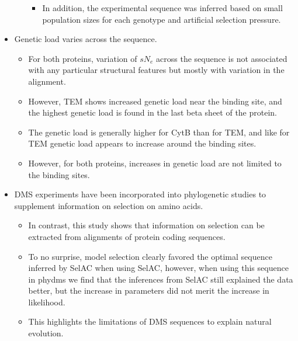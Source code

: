 \documentclass[12pt]{article}
\begin{document}
\begin{itemize}
\begin{itemize}
\begin{itemize}
			\item In addition, the experimental sequence was inferred based on small population sizes for each genotype and artificial selection pressure. 
		\end{itemize}
	\end{itemize}
	\item Genetic load varies across the sequence.
	\begin{itemize}
		\item For both proteins, variation of $sN_e$ across the sequence is not associated with any particular structural features but mostly with variation in the alignment.
		\item However, TEM shows increased genetic load near the binding site, and the highest genetic load is found in the last beta sheet of the protein.
		\item The genetic load is generally higher for CytB than for TEM, and like for TEM genetic load appears to increase around the binding sites.
		\item However, for both proteins, increases in genetic load are not limited to the binding sites.
	\end{itemize}
	\item DMS experiments have been incorporated into phylogenetic studies to supplement information on selection on amino acids.
	\begin{itemize}
		\item In contrast, this study shows that information on selection can be extracted from alignments of protein coding sequences.
		\item To no surprise, model selection clearly favored the optimal sequence inferred by SelAC when using SelAC, however, when using this sequence in phydms we find that the inferences from SelAC still explained the data better, but the increase in parameters did not merit the increase in likelihood.
		\item This highlights the limitations of DMS sequences to explain natural evolution.
	\end{itemize}
\end{itemize}
\end{document}
